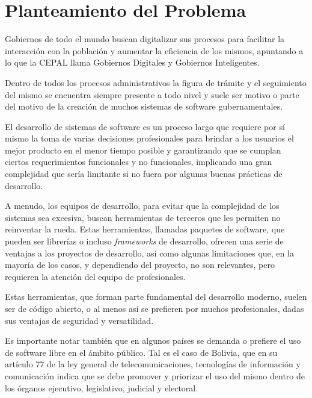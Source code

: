 \section{Planteamiento del Problema} \label{problem_statement}

Gobiernos de todo el mundo buscan digitalizar sus
procesos para facilitar la interacción con la población y aumentar la eficiencia
de los mismos, apuntando a lo que la CEPAL llama Gobiernos Digitales y Gobiernos
Inteligentes.

Dentro de todos los procesos administrativos la figura de trámite y el
seguimiento del mismo se encuentra siempre presente a todo nivel y suele ser
motivo o parte del motivo de la creación de muchos sistemas de software
gubernamentales.

El desarrollo de sistemas de software es un proceso largo que requiere por sí
mismo la toma de varias decisiones profesionales para brindar a los usuarios el
mejor producto en el menor tiempo posible y garantizando que se cumplan ciertos
requerimientos funcionales y no funcionales, implicando una gran complejidad que
sería limitante si no fuera por algunas buenas prácticas de desarrollo.

A menudo, los equipos de desarrollo, para evitar que la complejidad de los
sistemas sea excesiva, buscan herramientas de terceros que les permiten no
reinventar la rueda. Estas herramientas, llamadas paquetes de software, que
pueden ser librerías o incluso \textit{frameworks} de desarrollo, ofrecen una serie de
ventajas a los proyectos de desarrollo, así como algunas limitaciones que, en la
mayoría de los casos, y dependiendo del proyecto, no son relevantes, pero
requieren la atención del equipo de profesionales.

Estas herramientas, que forman parte fundamental del desarrollo moderno, suelen
ser de código abierto, o al menos así se prefieren por muchos profesionales,
dadas sus ventajas de seguridad y versatilidad.

Es importante notar también que en algunos países se demanda o prefiere el uso
de software libre en el ámbito público. Tal es el caso de Bolivia, que en su
artículo 77 de la ley general de telecomunicaciones, tecnologías de información
y comunicación indica que se debe promover y priorizar el uso del mismo dentro
de los órganos ejecutivo, legislativo, judicial y electoral.

